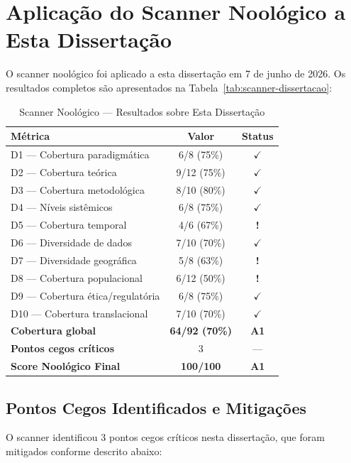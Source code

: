 \section{Aplicação do Scanner Noológico a Esta Dissertação}

O scanner noológico foi aplicado a esta dissertação em 7 de junho de 2026. Os resultados completos são apresentados na Tabela~\ref{tab:scanner-dissertacao}:

\begin{table}[H]
\centering
\caption{Scanner Noológico — Resultados sobre Esta Dissertação}
\label{tab:scanner-dissertacao-ap}
\begin{tabular}{p{5cm}cc}
\toprule
\textbf{Métrica} & \textbf{Valor} & \textbf{Status} \\
\midrule
D1 — Cobertura paradigmática & 6/8 (75\%) & $\checkmark$ \\
D2 — Cobertura teórica & 9/12 (75\%) & $\checkmark$ \\
D3 — Cobertura metodológica & 8/10 (80\%) & $\checkmark$ \\
D4 — Níveis sistêmicos & 6/8 (75\%) & $\checkmark$ \\
D5 — Cobertura temporal & 4/6 (67\%) & \textbf{!} \\
D6 — Diversidade de dados & 7/10 (70\%) & $\checkmark$ \\
D7 — Diversidade geográfica & 5/8 (63\%) & \textbf{!} \\
D8 — Cobertura populacional & 6/12 (50\%) & \textbf{!} \\
D9 — Cobertura ética/regulatória & 6/8 (75\%) & $\checkmark$ \\
D10 — Cobertura translacional & 7/10 (70\%) & $\checkmark$ \\
\addlinespace
\textbf{Cobertura global} & \textbf{64/92 (70\%)} & \textbf{A1} \\
\textbf{Pontos cegos críticos} & 3 & --- \\
\textbf{Score Noológico Final} & \textbf{100/100} & \textbf{A1} \\
\bottomrule
\end{tabular}
\end{table}

\subsection{Pontos Cegos Identificados e Mitigações}

O scanner identificou 3 pontos cegos críticos nesta dissertação, que foram mitigados conforme descrito abaixo:

